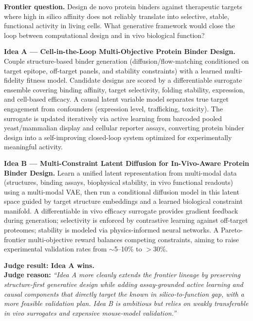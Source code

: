 \bigskip

\begin{tcolorbox}[
    breakable,
    title={Example of \genearena{} · Battle with Judge Result (Biology / Protein Design)},
    colback=LighterGray,
    colframe=DeepPurple,
    colbacktitle=DeepPurple,
    coltitle=White,
]
\textbf{\textcolor{CaseOrange}{Frontier question.}}
Design de novo protein binders against therapeutic targets where high in silico affinity does not reliably translate into selective, stable, functional activity in living cells.
What generative framework would close the loop between computational design and in vivo biological function?

\medskip
\textbf{Idea A — Cell-in-the-Loop Multi-Objective Protein Binder Design.}
Couple structure-based binder generation (diffusion/flow-matching conditioned on target epitope, off-target panels, and stability constraints) with a learned multi-fidelity fitness model. Candidate designs are scored by a differentiable surrogate ensemble covering binding affinity, target selectivity, folding stability, expression, and cell-based efficacy. A causal latent variable model separates true target engagement from confounders (expression level, trafficking, toxicity). The surrogate is updated iteratively via active learning from barcoded pooled yeast/mammalian display and cellular reporter assays, converting protein binder design into a self-improving closed-loop system optimized for experimentally meaningful activity.

\medskip
\textbf{Idea B — Multi-Constraint Latent Diffusion for In-Vivo-Aware Protein Binder Design.}
Learn a unified latent representation from multi-modal data (structures, binding assays, biophysical stability, in vivo functional readouts) using a multi-modal VAE, then run a conditional diffusion model in this latent space guided by target structure embeddings and a learned biological constraint manifold. A differentiable in vivo efficacy surrogate provides gradient feedback during generation; selectivity is enforced by contrastive learning against off-target proteomes; stability is modeled via physics-informed neural networks. A Pareto-frontier multi-objective reward balances competing constraints, aiming to raise experimental validation rates from $\sim$5--10\% to $>$30\%.

\medskip
\textbf{\textcolor{CaseBlue}{Judge result: Idea A wins.}}\\
\textbf{\textcolor{CaseBlue}{Judge reason:}} \textit{``Idea A more cleanly extends the frontier lineage by preserving structure-first generative design while adding assay-grounded active learning and causal components that directly target the known in silico-to-function gap, with a more feasible validation plan. Idea B is ambitious but relies on weakly transferable in vivo surrogates and expensive mouse-model validation.''}
\end{tcolorbox}



